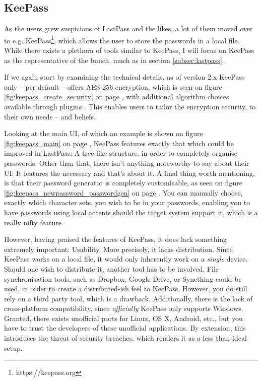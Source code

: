 		\subsection{KeePass}
			As the users grew suspicious of LastPass and the likes, a lot of them moved over to e.g. KeePass\footnote{https://keepass.org}, which allows the user to store the passwords in a local file. While there exists a plethora of tools similar to KeePass, I will focus on KeePass as the representative of the bunch, much as in section \ref{subsec:lastpass}.

			If we again start by examining the technical details, as of version 2.x KeePass only -- per default -- offers AES-256 encryption, which is seen on figure \ref{fig:keepass_create_security} on page \pageref{fig:keepass_create_security}, with additional algorithm choices available through plugins \cite{keepass_security}. This enables users to tailor the encryption security, to their own needs -- and beliefs. 

			Looking at the main UI, of which an example is shown on figure \ref{fig:keepass_main} on page \pageref{fig:keepass_main}, KeePass features exactly that which could be improved in LastPass: A tree like structure, in order to completely organise passwords. Other than that, there isn't anything noteworthy to say about their UI: It features the necessary and that's about it. A final thing worth mentioning, is that their password generator is completely customisable, as seen on figure \ref{fig:keepass_newpassword_passwordgen} on page \pageref{fig:keepass_newpassword_passwordgen}. You can manually choose, exactly which character sets, you wish to be in your passwords, enabling you to have passwords using local accents should the target system support it, which is a really nifty feature.

			However, having praised the features of KeePass, it does lack something extremely important: Usability. More precisely, it lacks distribution. Since KeePass works on a local file, it would only inherently work on a \emph{single} device. Should one wish to distribute it, another tool has to be involved. File synchronisation tools, such as Dropbox, Google Drive, or Syncthing could be used, in order to create a distributed-ish feel to KeePass. However, you do still rely on a third party tool, which is a drawback. Additionally, there is the lack of cross-platform compatibility, since \emph{officially} KeePass only supports Windows. Granted, there exists unofficial ports for Linux, OS X, Android, etc., but you have to trust the developers of these unofficial applications. By extension, this introduces the threat of security breaches, which renders it as a less than ideal setup.

